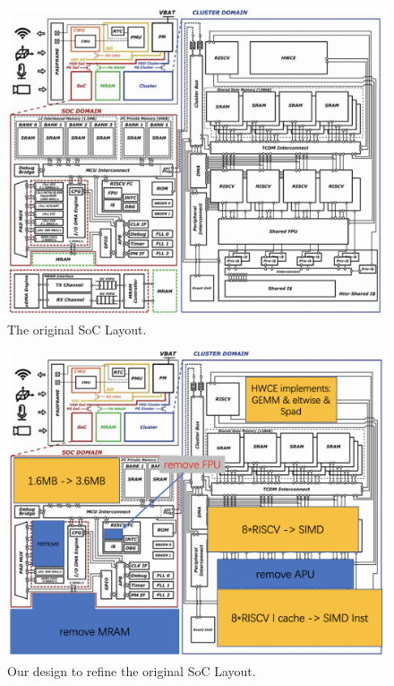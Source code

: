 \documentclass[default,iicol]{sn-jnl}%
\theoremstyle{thmstyleone}%
\theoremstyle{thmstyletwo}%
\theoremstyle{thmstylethree}%
\begin{document}
\begin{appendices}
\begin{figure}[H]
	\begin{center}
  		\includegraphics[width=1.0\linewidth]{SoC_original.png}
	\end{center}
   	\caption{The original SoC Layout.}
	\label{fig:SoC_original}
\end{figure}

\begin{figure}[H]
	\begin{center}
  		\includegraphics[width=1.0\linewidth]{SoC_new.png}
	\end{center}
   	\caption{Our design to refine the original SoC Layout.}
	\label{fig:SoC_new}
\end{figure}


\end{appendices}
\end{document}
